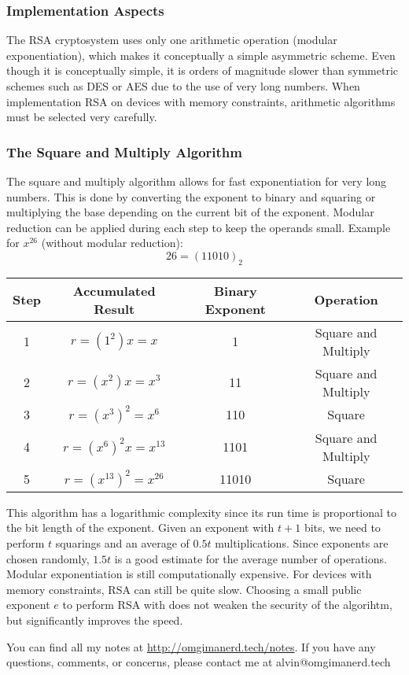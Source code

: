 \documentclass{math}
\begin{document}
\subsubsection*{Implementation Aspects}
The RSA cryptosystem uses only one arithmetic operation (modular
exponentiation), which makes it conceptually a simple asymmetric scheme. Even
though it is conceptually simple, it is orders of magnitude slower than
symmetric schemes such as DES or AES due to the use of very long numbers.
When implementation RSA on devices with memory constraints, arithmetic
algorithms must be selected very carefully.

\subsubsection*{The Square and Multiply Algorithm}
The square and multiply algorithm allows for fast exponentiation for very long
numbers. This is done by converting the exponent to binary and squaring or
multiplying the base depending on the current bit of the exponent. Modular
reduction can be applied during each step to keep the operands small. Example
for \( x^26 \) (without modular reduction):
\[ 26 = (11010)_2 \]
\begin{center}
  \begin{tabular}{|c|c|c|c|}
    \hline
    Step & Accumulated Result & Binary Exponent & Operation \\
    \hline
    1 & \( r = (1^2)x = x \) & 1 & Square and Multiply \\
    \hline
    2 & \( r = (x^2)x = x^3 \) & 11 & Square and Multiply \\
    \hline
    3 & \( r = (x^3)^2 = x^6 \) & 110 & Square \\
    \hline
    4 & \( r = (x^6)^2x = x^{13} \) & 1101 & Square and Multiply \\
    \hline
    5 & \( r = (x^{13})^2 = x^{26} \) & 11010 & Square \\
    \hline
  \end{tabular}
\end{center}
This algorithm has a logarithmic complexity since its run time is proportional
to the bit length of the exponent. Given an exponent with \( t+1 \) bits, we
need to perform \( t \) squarings and an average of \( 0.5t \) multiplications.
Since exponents are chosen randomly, \( 1.5t \) is a good estimate for the
average number of operations. Modular exponentiation is still computationally
expensive. For devices with memory constraints, RSA can still be quite slow.
Choosing a small public exponent \( e \) to perform RSA with does not weaken
the security of the algorihtm, but significantly improves the speed.

\begin{center}
  You can find all my notes at \url{http://omgimanerd.tech/notes}. If you have
  any questions, comments, or concerns, please contact me at
  alvin@omgimanerd.tech
\end{center}
\end{document}
